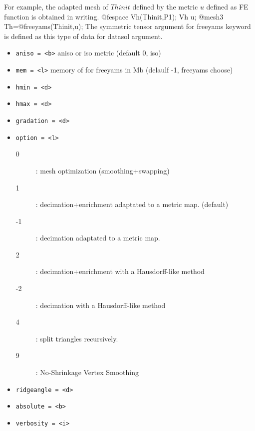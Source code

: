 \documentclass[a4paper,twoside,12pt]{book}
\begin{document}
For example, the  adapted mesh of $Thinit$ defined by the metric $u$ defined as FE function is obtained in writing.
\bFF
@fespace Vh(Thinit,P1);
Vh u;
@mesh3 Th=@freeyams(Thinit,u);
\eFF
The symmetric tensor argument for freeyams keyword is defined as this type of data for datasol argument.
\begin{itemize}
\parskip=0pt
\item	\texttt{aniso =  <b>}  aniso or iso metric  (default 0, iso)
\item	\texttt{mem =  <l>}  memory of for freeyams in Mb (delaulf -1, freeyams choose)
\item	\texttt{hmin =  <d>}  
\item	\texttt{hmax =  <d>}
\item	\texttt{gradation =  <d>}  
\item	\texttt{option =  <l>}
\begin{description}

 \item  [0] : mesh optimization (smoothing+swapping)
 \item  [1] :  decimation+enrichment adaptated to a metric map.  (default)
 \item [-1]: decimation adaptated to a metric map. 
 \item  [2] : decimation+enrichment with a Hausdorff-like method
 \item [-2]:  decimation  with a Hausdorff-like method
 \item  [4] : split triangles recursively. 
 \item  [9] : No-Shrinkage Vertex Smoothing
 \end{description}

\item	\texttt{ridgeangle =  <d>}
\item	\texttt{absolute =  <b>}
\item	\texttt{verbosity =  <i>}



\end{itemize}
\end{document}
